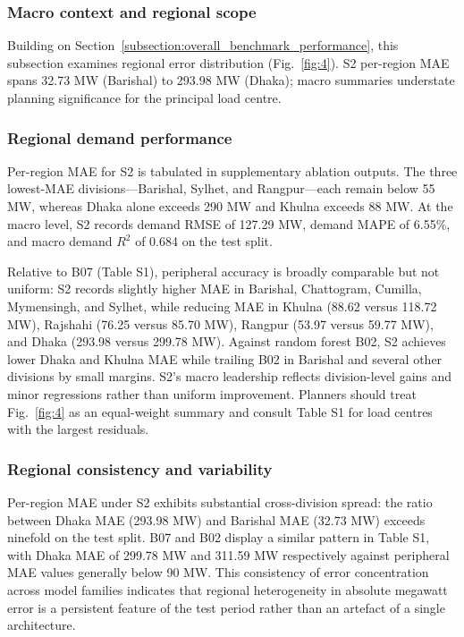 \subsubsection{Macro context and regional scope}\label{subsubsection:macro_context_and_regional_scope}

Building on Section~\ref{subsection:overall_benchmark_performance}, this subsection examines regional error distribution (Fig.~\ref{fig:4}). S2 per-region MAE spans 32.73 MW (Barishal) to 293.98 MW (Dhaka); macro summaries understate planning significance for the principal load centre.

\subsubsection{Regional demand performance}\label{subsubsection:regional_demand_performance}

Per-region MAE for S2 is tabulated in supplementary ablation outputs. The three lowest-MAE divisions---Barishal, Sylhet, and Rangpur---each remain below 55 MW, whereas Dhaka alone exceeds 290 MW and Khulna exceeds 88 MW. At the macro level, S2 records demand RMSE of 127.29 MW, demand MAPE of 6.55\%, and macro demand $R^2$ of 0.684 on the test split.

Relative to B07 (Table S1), peripheral accuracy is broadly comparable but not uniform: S2 records slightly higher MAE in Barishal, Chattogram, Cumilla, Mymensingh, and Sylhet, while reducing MAE in Khulna (88.62 versus 118.72 MW), Rajshahi (76.25 versus 85.70 MW), Rangpur (53.97 versus 59.77 MW), and Dhaka (293.98 versus 299.78 MW). Against random forest B02, S2 achieves lower Dhaka and Khulna MAE while trailing B02 in Barishal and several other divisions by small margins. S2's macro leadership reflects division-level gains and minor regressions rather than uniform improvement. Planners should treat Fig.~\ref{fig:4} as an equal-weight summary and consult Table S1 for load centres with the largest residuals.

\subsubsection{Regional consistency and variability}\label{subsubsection:regional_consistency_and_variability}

Per-region MAE under S2 exhibits substantial cross-division spread: the ratio between Dhaka MAE (293.98 MW) and Barishal MAE (32.73 MW) exceeds ninefold on the test split. B07 and B02 display a similar pattern in Table S1, with Dhaka MAE of 299.78 MW and 311.59 MW respectively against peripheral MAE values generally below 90 MW. This consistency of error concentration across model families indicates that regional heterogeneity in absolute megawatt error is a persistent feature of the test period rather than an artefact of a single architecture.

